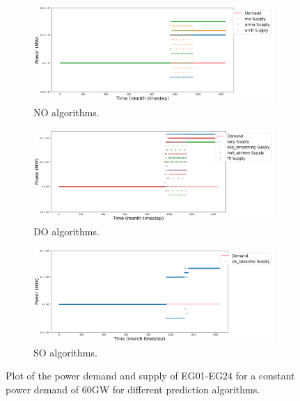 \documentclass[11pt,letterpaper]{article}
\begin{document}
\begin{figure}[!htbp]
	\centering
	\begin{subfigure}[t]{\textwidth}
		\centering
		\includegraphics[width=\linewidth]{24-power-bufferB20001.png} 
		\caption{NO algorithms.}
		\label{fig:24powerNO}
	\end{subfigure}
	\vspace{1cm}
	\begin{subfigure}[t]{\textwidth}
		\centering
		\includegraphics[width=\linewidth]{24-power-bufferB20002.png} 
		\caption{DO algorithms.}
		\label{fig:24powerDO}
	\end{subfigure}
	\begin{subfigure}[t]{.95\textwidth}
		\centering
		\includegraphics[width=\linewidth]{24-power-bufferB20003.png} 
		\caption{SO algorithms.}
		\label{fig:24powerSO}
\end{subfigure}
	\hfill
	\caption{Plot of the power demand and supply of EG01-EG24 for a constant power demand of 60GW for different prediction algorithms.}
	\label{fig:24power}
\end{figure}
\end{document}
